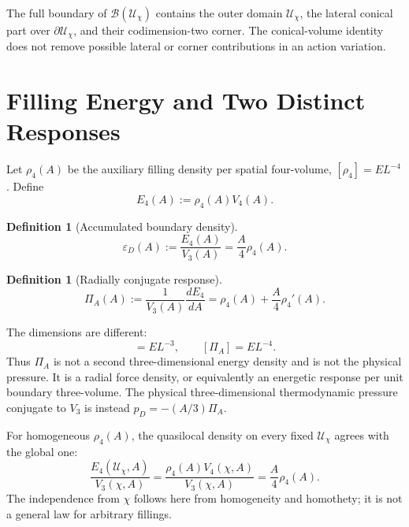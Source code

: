 \documentclass[11pt,a4paper]{article}
\def\dd{d}%
\numberwithin{equation}{section}
\theoremstyle{definition}
\newtheorem{definition}[criterion]{Definition}
\theoremstyle{plain}
\theoremstyle{remark}
\newcommand{\Dom}{\mathcal{U}}
\newcommand{\B}{\mathcal{B}}
\newcommand{\Efour}{E_4}
\newcommand{\rhoFour}{\rho_4}
\newcommand{\epsD}{\varepsilon_D}
\newcommand{\pD}{p_D}
\newcommand{\PiA}{\Pi_A}
\newcommand{\dd}{\mathrm{d}}
\begin{document}
The full boundary of \(\B(\Dom_\chi)\) contains the outer domain \(\Dom_\chi\), the lateral conical part over \(\partial\Dom_\chi\), and their codimension-two corner. The conical-volume identity does not remove possible lateral or corner contributions in an action variation.

\section{Filling Energy and Two Distinct Responses}
Let \(\rhoFour(A)\) be the auxiliary filling density per spatial four-volume, \([\rhoFour]=EL^{-4}\). Define
\begin{equation}
\Efour(A):=\rhoFour(A)V_4(A).
\end{equation}

\begin{definition}[Accumulated boundary density]
\begin{equation}
\epsD(A):=\frac{\Efour(A)}{V_3(A)}=\frac{A}{4}\rhoFour(A).
\end{equation}
\end{definition}

\begin{definition}[Radially conjugate response]
\begin{equation}
\PiA(A):=\frac{1}{V_3(A)}\frac{\dd\Efour}{\dd A}
=\rhoFour(A)+\frac{A}{4}\rhoFour'(A).
\end{equation}
\end{definition}

The dimensions are different:
\begin{equation}
[\epsD]=EL^{-3},
\qquad
[\PiA]=EL^{-4}.
\end{equation}
Thus \(\PiA\) is not a second three-dimensional energy density and is not the physical pressure. It is a radial force density, or equivalently an energetic response per unit boundary three-volume. The physical three-dimensional thermodynamic pressure conjugate to \(V_3\) is instead \(\pD=-(A/3)\PiA\).

For homogeneous \(\rhoFour(A)\), the quasilocal density on every fixed \(\Dom_\chi\) agrees with the global one:
\begin{equation}
\frac{\Efour(\Dom_\chi,A)}{V_3(\chi,A)}
=\frac{\rhoFour(A)V_4(\chi,A)}{V_3(\chi,A)}
=\frac{A}{4}\rhoFour(A).
\end{equation}
The independence from \(\chi\) follows here from homogeneity and homothety; it is not a general law for arbitrary fillings.
\end{document}
